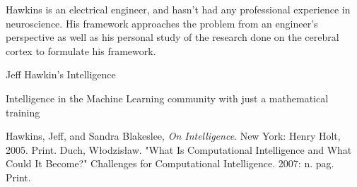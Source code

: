\documentclass[11pt, oneside]{article}
\begin{document}
\par Hawkins is an electrical engineer, and hasn't had any professional experience in neuroscience. His framework approaches the problem from an engineer's perspective as well as his personal study of the research done on the cerebral cortex to formulate his framework.
\par Jeff Hawkin's Intelligence

\par Intelligence in the Machine Learning community with just a mathematical training

\begin{thebibliography}{9}
	Hawkins, Jeff, and Sandra Blakeslee,
	\emph{On Intelligence}.
	New York: Henry Holt, 2005.
	Print.
	Duch, W\l{}odzis\l{}aw.
	"What Is Computational Intelligence and What Could It Become?" Challenges for Computational Intelligence.
	2007: n. pag. Print.
\end{thebibliography}
\end{document}
